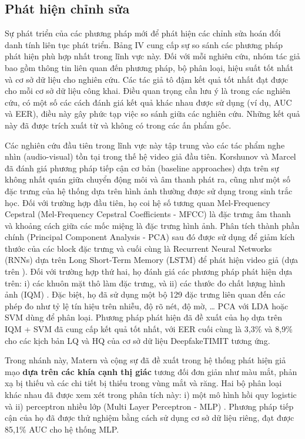 \documentclass{article}
\begin{document}
\subsection{Phát hiện chỉnh sửa} \label{sec:4-b-detector}

Sự phát triển của các phương pháp mới để phát hiện các chỉnh sửa hoán đổi danh tính liên tục phát triển. Bảng IV cung cấp sự so sánh các phương pháp phát hiện phù hợp nhất trong lĩnh vực này. Đối với mỗi nghiên cứu, nhóm tác giả bao gồm thông tin liên quan đến phương pháp, bộ phân loại, hiệu suất tốt nhất và cơ sở dữ liệu cho nghiên cứu. Các tác giả tô đậm kết quả tốt nhất đạt được cho mỗi cơ sở dữ liệu công khai. Điều quan trọng cần lưu ý là trong các nghiên cứu, có một số các cách đánh giá kết quả khác nhau được sử dụng (ví dụ, AUC và EER), điều này gây phức tạp việc so sánh giữa các nghiên cứu. Những kết quả này đã được trích xuất từ  và không có trong các ấn phẩm gốc.


Các nghiên cứu đầu tiên trong lĩnh vực này tập trung vào các tác phẩm nghe nhìn (audio-visual) tồn tại trong thế hệ video giả đầu tiên. Korshunov và Marcel đã đánh giá  phương pháp tiếp cận cơ bản (baseline approaches) dựa trên sự không nhất quán giữa chuyển động môi và âm thanh phát ra, cũng như một số đặc trưng của hệ thống dựa trên hình ảnh thường được sử dụng trong sinh trắc học. Đối với trường hợp đầu tiên, họ coi hệ số tương quan Mel-Frequency Cepstral (Mel-Frequency Cepstral Coefficients - MFCC) là đặc trưng âm thanh và khoảng cách giữa các mốc miệng là đặc trưng hình ảnh. Phân tích thành phần chính (Principal Component Analysis - PCA) sau đó được sử dụng để giảm kích thước của các block đặc trưng và cuối cùng là Recurrent Neural Networks (RNNs) dựa trên Long Short-Term Memory (LSTM) để phát hiện video giả (dựa trên ). Đối với trường hợp thứ hai, họ đánh giá các phương pháp phát hiện dựa trên: i) các khuôn mặt thô làm đặc trưng, và ii) các thước đo chất lượng hình ảnh (IQM) . Đặc biệt, họ đã sử dụng một bộ 129 đặc trưng liên quan đến các phép đo như tỷ lệ tín hiệu trên nhiễu, độ rõ nét, độ mờ, … PCA với LDA hoặc SVM dùng để phân loại. Phương pháp phát hiện đã đề xuất của họ dựa trên IQM + SVM đã cung cấp kết quả tốt nhất, với EER cuối cùng là 3,3\% và 8,9\% cho các kịch bản LQ và HQ của cơ sở dữ liệu DeepfakeTIMIT tương ứng.

Trong nhánh này, Matern và cộng sự đã đề xuất trong  hệ thống phát hiện giả mạo \textbf{dựa trên các khía cạnh thị giác} tương đối đơn giản như màu mắt, phản xạ bị thiếu và các chi tiết bị thiếu trong vùng mắt và răng. Hai bộ phân loại khác nhau đã được xem xét trong phân tích này: i) một mô hình hồi quy logistic và ii) perceptron nhiều lớp (Multi Layer Perceptron - MLP) . Phương pháp tiếp cận của họ đã được thử nghiệm bằng cách sử dụng cơ sở dữ liệu riêng, đạt được 85,1\% AUC cho hệ thống MLP.
\end{document}
